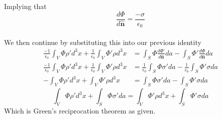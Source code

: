 \documentclass{article}
\begin{document}
Implying that 
\[ \frac{d\Phi}{d\mathbf{\hat{n}}} = \frac{-\sigma}{\epsilon_{0}} \]
\\
We then continue by substituting this into our previous identity
\begin{align*}
\frac{-1}{\epsilon_{0}}\int_{V} \Phi\rho' d^{3}x + \frac{1}{\epsilon_{0}}\int_{V} \Phi'\rho d^{3}x &= \int_{S} \Phi\frac{d\Phi'}{d\mathbf{\hat{n}}} da - \int_{S} \Phi'\frac{d\Phi}{d\mathbf{\hat{n}}} da \\
\frac{-1}{\epsilon_{0}}\int_{V} \Phi\rho' d^{3}x + \frac{1}{\epsilon_{0}}\int_{V} \Phi'\rho d^{3}x &= \frac{1}{\epsilon_{0}}\int_{S} \Phi\sigma' da - \frac{1}{\epsilon_{0}}\int_{S} \Phi'\sigma da \\
-\int_{V} \Phi\rho' d^{3}x + \int_{V} \Phi'\rho d^{3}x &= \int_{S} \Phi\sigma' da - \int_{S} \Phi'\sigma da
\end{align*}
\[ \boxed{\int_{V} \Phi\rho' d^{3}x + \int_{S} \Phi\sigma' da = \int_{V} \Phi'\rho d^{3}x + \int_{S} \Phi'\sigma da} \]
Which is Green's reciprocation theorem as given.
\end{document}
